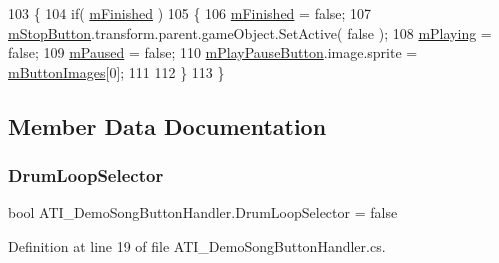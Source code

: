\begin{DoxyCode}
103     \{
104         \textcolor{keywordflow}{if}( \hyperlink{class_a_t_i___demo_song_button_handler_a4a9d01d8ee385c66a6a27da6d9d94f18}{mFinished} )
105         \{
106             \hyperlink{class_a_t_i___demo_song_button_handler_a4a9d01d8ee385c66a6a27da6d9d94f18}{mFinished} = \textcolor{keyword}{false};
107             \hyperlink{class_a_t_i___demo_song_button_handler_ad6a342b9b2333c8c613b968a0ca7545c}{mStopButton}.transform.parent.gameObject.SetActive( \textcolor{keyword}{false} );
108             \hyperlink{class_a_t_i___demo_song_button_handler_aefbba0db111a0d4ba1b1d9f5c1cae41d}{mPlaying} = \textcolor{keyword}{false};
109             \hyperlink{class_a_t_i___demo_song_button_handler_abee877053d95bfba813d61d5a5d87a23}{mPaused} = \textcolor{keyword}{false};
110             \hyperlink{class_a_t_i___demo_song_button_handler_a9f3be8593e24316510ca461f105061fd}{mPlayPauseButton}.image.sprite = \hyperlink{class_a_t_i___demo_song_button_handler_a9d62cca93ee54ba52e0c7de5f30d9490}{mButtonImages}[0];
111 
112         \}
113     \}
\end{DoxyCode}


\subsection{Member Data Documentation}
\mbox{\label{class_a_t_i___demo_song_button_handler_a772b617c22a316a99f3a4b6979d0657a}} 
\subsubsection{\texorpdfstring{Drum\+Loop\+Selector}{DrumLoopSelector}}
{\footnotesize\ttfamily bool A\+T\+I\+\_\+\+Demo\+Song\+Button\+Handler.\+Drum\+Loop\+Selector = false}



Definition at line 19 of file A\+T\+I\+\_\+\+Demo\+Song\+Button\+Handler.\+cs.

\mbox{\label{class_a_t_i___demo_song_button_handler_a14e70250c780214dc71d2aae6d638a25}} 
